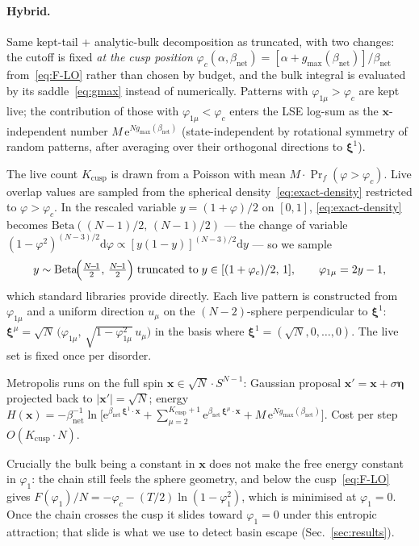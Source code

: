 \documentclass[11pt]{article}
\newcommand{\bxi}{\boldsymbol{\xi}}
\newcommand{\bx}{\bm{x}}
\newcommand{\e}{{\mathrm{e}}}
\newcommand{\dd}{{\mathrm{d}}}
\newcommand{\Bnet}{\beta_{\mathrm{net}}}
\newcommand{\gmax}{g_{\max}}
\begin{document}
\paragraph{Hybrid.}
Same kept-tail + analytic-bulk decomposition as truncated, with two
changes: the cutoff is fixed \emph{at the cusp position} $\varphi_c(\alpha,
\Bnet) = [\alpha + \gmax(\Bnet)]/\Bnet$ from~\eqref{eq:F-LO} rather than
chosen by budget, and the bulk integral is evaluated by its
saddle~\eqref{eq:gmax} instead of numerically.  Patterns with
$\varphi_{1\mu} > \varphi_c$ are kept live; the contribution of those
with $\varphi_{1\mu} < \varphi_c$ enters the LSE log-sum as the
$\bx$-independent number $M\,\e^{N \gmax(\Bnet)}$ (state-independent by
rotational symmetry of random patterns, after averaging over their
orthogonal directions to $\bxi^1$).

The live count $K_{\mathrm{cusp}}$ is drawn from a Poisson with mean
$M \cdot \Pr_f(\varphi > \varphi_c)$.  Live overlap values are sampled
from the spherical density~\eqref{eq:exact-density} restricted to
$\varphi > \varphi_c$.  In the rescaled variable $y = (1 + \varphi)/2$
on $[0, 1]$, \eqref{eq:exact-density} becomes
$\mathrm{Beta}((N\!-\!1)/2,\,(N\!-\!1)/2)$ — the change of variable
$(1 - \varphi^2)^{(N-3)/2}\dd\varphi \propto
[y(1-y)]^{(N-3)/2}\dd y$ — so we sample
\begin{equation}
y \sim \mathrm{Beta}\!\Bigl(\tfrac{N\!-\!1}{2},\,\tfrac{N\!-\!1}{2}\Bigr)
   \;\text{truncated to}\; y \in [(1 + \varphi_c)/2,\,1],
\qquad
\varphi_{1\mu} = 2y - 1,
\label{eq:beta-tail}
\end{equation}
which standard libraries provide directly.  Each live pattern is
constructed from $\varphi_{1\mu}$ and a uniform direction $u_\mu$ on the
$(N\!-\!2)$-sphere perpendicular to $\bxi^1$:
$\bxi^\mu = \sqrt N\,\bigl(\varphi_{1\mu},\,\sqrt{1 - \varphi_{1\mu}^2}\,
u_\mu\bigr)$ in the basis where $\bxi^1 = (\sqrt N, 0, \ldots, 0)$.
The live set is fixed once per disorder.

Metropolis runs on the full spin $\bx \in \sqrt N \cdot S^{N-1}$:
Gaussian proposal $\bx' = \bx + \sigma \boldsymbol\eta$ projected back
to $|\bx'| = \sqrt N$; energy
$H(\bx) = -\Bnet^{-1} \ln\!\bigl[\e^{\Bnet\,\bxi^1\!\cdot\!\bx}
+ \sum_{\mu=2}^{K_{\mathrm{cusp}}+1}\!\e^{\Bnet\,\bxi^\mu\!\cdot\!\bx}
+ M\,\e^{N \gmax(\Bnet)}\bigr]$.  Cost per step
$O(K_{\mathrm{cusp}} \cdot N)$.

Crucially the bulk being a constant in $\bx$ does not make the free
energy constant in $\varphi_1$: the chain still feels the sphere
geometry, and below the cusp~\eqref{eq:F-LO} gives
$F(\varphi_1)/N = -\varphi_c - (T/2) \ln(1 - \varphi_1^2)$, which is
minimised at $\varphi_1 = 0$.  Once the chain crosses the cusp it slides
toward $\varphi_1 = 0$ under this entropic attraction; that slide is
what we use to detect basin escape (Sec.~\ref{sec:results}).
\end{document}
